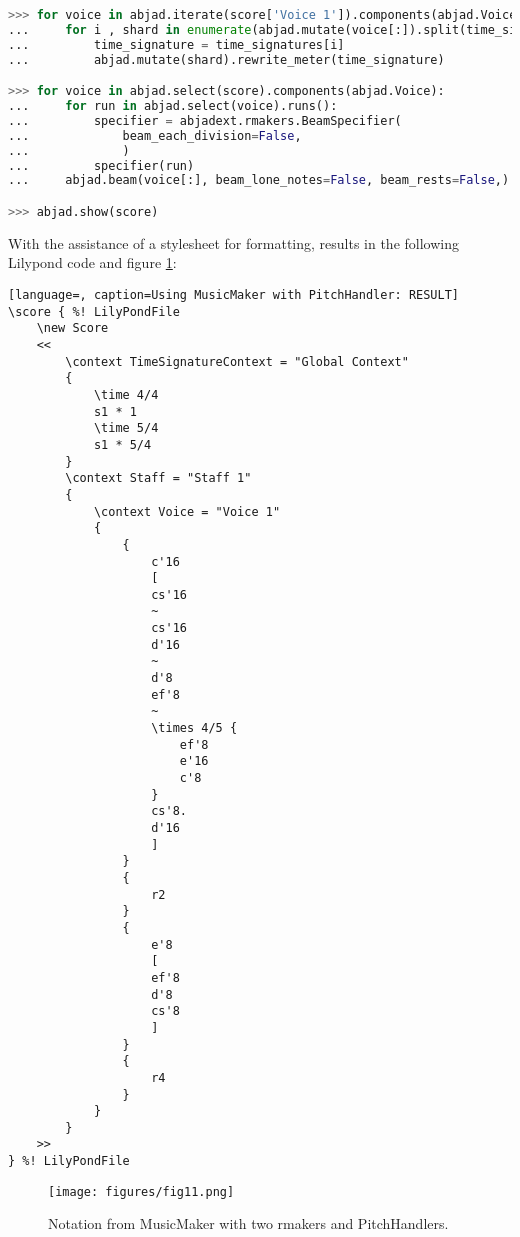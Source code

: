 \begin{lstlisting}[language=Python, caption=Using MusicMaker with PitchHandler]
>>> for voice in abjad.iterate(score['Voice 1']).components(abjad.Voice):
...     for i , shard in enumerate(abjad.mutate(voice[:]).split(time_signatures)):
...         time_signature = time_signatures[i]
...         abjad.mutate(shard).rewrite_meter(time_signature)

>>> for voice in abjad.select(score).components(abjad.Voice):
...     for run in abjad.select(voice).runs():
...         specifier = abjadext.rmakers.BeamSpecifier(
...             beam_each_division=False,
...             )
...         specifier(run)
...     abjad.beam(voice[:], beam_lone_notes=False, beam_rests=False,)

>>> abjad.show(score)
\end{lstlisting}
\doublespace

With the assistance of a stylesheet for formatting, results in the following Lilypond code and figure \ref{fig:music_maker}:

\singlespace
\begin{lstlisting}[language=, caption=Using MusicMaker with PitchHandler: RESULT]
\score { %! LilyPondFile
    \new Score
    <<
        \context TimeSignatureContext = "Global Context"
        {
            \time 4/4
            s1 * 1
            \time 5/4
            s1 * 5/4
        }
        \context Staff = "Staff 1"
        {
            \context Voice = "Voice 1"
            {
                {
                    c'16
                    [
                    cs'16
                    ~
                    cs'16
                    d'16
                    ~
                    d'8
                    ef'8
                    ~
                    \times 4/5 {
                        ef'8
                        e'16
                        c'8
                    }
                    cs'8.
                    d'16
                    ]
                }
                {
                    r2
                }
                {
                    e'8
                    [
                    ef'8
                    d'8
                    cs'8
                    ]
                }
                {
                    r4
                }
            }
        }
    >>
} %! LilyPondFile
\end{lstlisting}
\doublespace

\singlespace
\begin{figure}[h]
  \texttt{[image: figures/fig11.png]}
  \caption{Notation from MusicMaker with two rmakers and PitchHandlers.}
  \label{fig:music_maker}
\end{figure}
\doublespace

